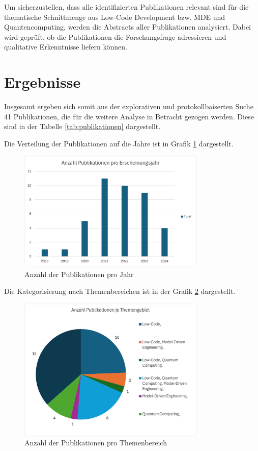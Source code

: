 Um sicherzustellen, dass alle identifizierten Publikationen relevant sind für die thematische Schnittmenge aus Low-Code Development bzw. 
MDE und Quantencomputing, werden die Abstracts aller Publikationen analysiert. Dabei wird geprüft, ob die Publikationen die 
Forschungsfrage adressieren und qualitative Erkenntnisse liefern können. 

\section{Ergebnisse}
Insgesamt ergeben sich somit aus der explorativen und protokollbaiserten Suche 41 Publikationen, die für die weitere Analyse 
in Betracht gezogen werden. Diese sind in der Tabelle \ref{tab:publikationen} dargestellt. 

Die Verteilung der Publikationen auf die Jahre ist in Grafik \ref{fig:publications_per_year} dargestellt.

\begin{figure}[h!]
    \centering
    \includegraphics[width=0.8\textwidth]{graphics/anzahl_pubs_jahr.png}
    \caption{Anzahl der Publikationen pro Jahr}
    \label{fig:publications_per_year}
\end{figure}

Die Kategorisierung nach Themenbereichen ist in der Grafik \ref{fig:publications_per_topic} dargestellt.

\begin{figure}[h!]
    \centering
    \includegraphics[width=0.8\textwidth]{graphics/anzahl_themen_pubs.png}
    \caption{Anzahl der Publikationen pro Themenbereich}
    \label{fig:publications_per_topic}
\end{figure}

